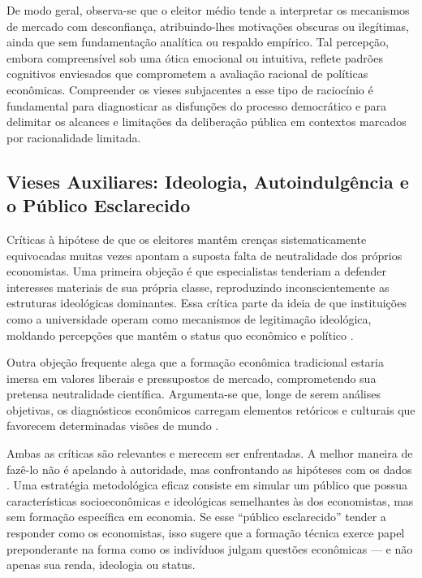 De modo geral, observa-se que o eleitor médio tende a interpretar os mecanismos de mercado com desconfiança, atribuindo-lhes motivações obscuras ou ilegítimas, ainda que sem fundamentação analítica ou respaldo empírico. Tal percepção, embora compreensível sob uma ótica emocional ou intuitiva, reflete padrões cognitivos enviesados que comprometem a avaliação racional de políticas econômicas. Compreender os vieses subjacentes a esse tipo de raciocínio é fundamental para diagnosticar as disfunções do processo democrático e para delimitar os alcances e limitações da deliberação pública em contextos marcados por racionalidade limitada.

\subsection{Vieses Auxiliares: Ideologia, Autoindulgência e o Público Esclarecido}
\label{sec:vieses_auxiliares}

Críticas à hipótese de que os eleitores mantêm crenças sistematicamente equivocadas muitas vezes apontam a suposta falta de neutralidade dos próprios economistas. Uma primeira objeção é que especialistas tenderiam a defender interesses materiais de sua própria classe, reproduzindo inconscientemente as estruturas ideológicas dominantes. Essa crítica parte da ideia de que instituições como a universidade operam como mecanismos de legitimação ideológica, moldando percepções que mantêm o status quo econômico e político \cite{althusser1971ideology, The_Myth_of_the_Rational_Voter}.

Outra objeção frequente alega que a formação econômica tradicional estaria imersa em valores liberais e pressupostos de mercado, comprometendo sua pretensa neutralidade científica. Argumenta-se que, longe de serem análises objetivas, os diagnósticos econômicos carregam elementos retóricos e culturais que favorecem determinadas visões de mundo \cite{mccloskey1998rhetoric, The_Myth_of_the_Rational_Voter}.

Ambas as críticas são relevantes e merecem ser enfrentadas. A melhor maneira de fazê-lo não é apelando à autoridade, mas confrontando as hipóteses com os dados \cite{popperlogic}. Uma estratégia metodológica eficaz consiste em simular um público que possua características socioeconômicas e ideológicas semelhantes às dos economistas, mas sem formação específica em economia. Se esse “público esclarecido” tender a responder como os economistas, isso sugere que a formação técnica exerce papel preponderante na forma como os indivíduos julgam questões econômicas — e não apenas sua renda, ideologia ou status.

